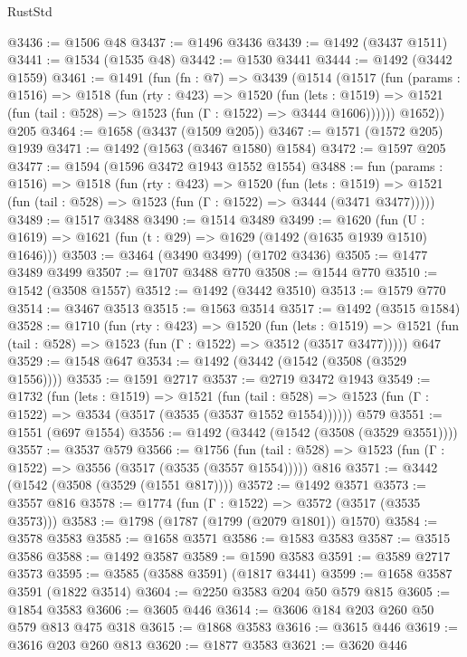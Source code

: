 \begin{lexlean}{RustStd}
\begin{coremodule}
@3436 := @1506 @48
@3437 := @1496 @3436
@3439 := @1492 (@3437 @1511)
@3441 := @1534 (@1535 @48)
@3442 := @1530 @3441
@3444 := @1492 (@3442 @1559)
@3461 := @1491
    (fun (fn : @7) =>
    @3439
      (@1514
        (@1517
          (fun (params : @1516) =>
          @1518
            (fun (rty : @423) =>
            @1520
              (fun (lets : @1519) =>
              @1521 (fun (tail : @528) => @1523 (fun (Γ : @1522) => @3444 @1606))))))
        @1652))
    @205
@3464 := @1658 (@3437 (@1509 @205))
@3467 := @1571 (@1572 @205) @1939
@3471 := @1492 (@1563 (@3467 @1580) @1584)
@3472 := @1597 @205
@3477 := @1594 (@1596 @3472 @1943 @1552 @1554)
@3488 := fun (params : @1516) =>
  @1518
    (fun (rty : @423) =>
    @1520
      (fun (lets : @1519) =>
      @1521 (fun (tail : @528) => @1523 (fun (Γ : @1522) => @3444 (@3471 @3477)))))
@3489 := @1517 @3488
@3490 := @1514 @3489
@3499 := @1620 (fun (U : @1619) => @1621 (fun (t : @29) => @1629 (@1492 (@1635 @1939 @1510) @1646)))
@3503 := @3464 (@3490 @3499) (@1702 @3436)
@3505 := @1477 @3489 @3499
@3507 := @1707 @3488 @770
@3508 := @1544 @770
@3510 := @1542 (@3508 @1557)
@3512 := @1492 (@3442 @3510)
@3513 := @1579 @770
@3514 := @3467 @3513
@3515 := @1563 @3514
@3517 := @1492 (@3515 @1584)
@3528 := @1710
    (fun (rty : @423) =>
    @1520
      (fun (lets : @1519) =>
      @1521 (fun (tail : @528) => @1523 (fun (Γ : @1522) => @3512 (@3517 @3477)))))
    @647
@3529 := @1548 @647
@3534 := @1492 (@3442 (@1542 (@3508 (@3529 @1556))))
@3535 := @1591 @2717
@3537 := @2719 @3472 @1943
@3549 := @1732
    (fun (lets : @1519) =>
    @1521
      (fun (tail : @528) => @1523 (fun (Γ : @1522) => @3534 (@3517 (@3535 (@3537 @1552 @1554))))))
    @579
@3551 := @1551 (@697 @1554)
@3556 := @1492 (@3442 (@1542 (@3508 (@3529 @3551))))
@3557 := @3537 @579
@3566 := @1756
    (fun (tail : @528) => @1523 (fun (Γ : @1522) => @3556 (@3517 (@3535 (@3557 @1554)))))
    @816
@3571 := @3442 (@1542 (@3508 (@3529 (@1551 @817))))
@3572 := @1492 @3571
@3573 := @3557 @816
@3578 := @1774 (fun (Γ : @1522) => @3572 (@3517 (@3535 @3573)))
@3583 := @1798 (@1787 (@1799 (@2079 @1801)) @1570)
@3584 := @3578 @3583
@3585 := @1658 @3571
@3586 := @1583 @3583
@3587 := @3515 @3586
@3588 := @1492 @3587
@3589 := @1590 @3583
@3591 := @3589 @2717 @3573
@3595 := @3585 (@3588 @3591) (@1817 @3441)
@3599 := @1658 @3587 @3591 (@1822 @3514)
@3604 := @2250 @3583 @204 @50 @579 @815
@3605 := @1854 @3583
@3606 := @3605 @446
@3614 := @3606 @184 @203 @260 @50 @579 @813 @475 @318
@3615 := @1868 @3583
@3616 := @3615 @446
@3619 := @3616 @203 @260 @813
@3620 := @1877 @3583
@3621 := @3620 @446

\end{coremodule}
\end{lexlean}
